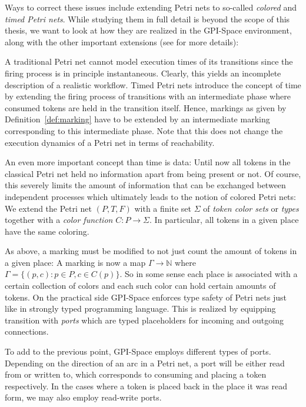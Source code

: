 \documentclass[
  paper=a4,
  titlepage,
  bibliography=totoc,
  pagesize=pdftex
]{scrartcl}
\numberwithin{figure}{section}
\numberwithin{equation}{section}
\numberwithin{table}{section}
\newcommand*\setN{\mathds{N}}
\theoremstyle{definition}
\numberwithin{definition}{section}
\begin{document}
Ways to correct these issues include extending Petri nets to so-called \emph{colored} and
\emph{timed Petri nets}. While studying them in full detail is beyond the scope of this
thesis, we want to look at how they are realized in the GPI-Space environment, along with
the other important extensions (see \cite[Section~3.2.2]{towardsParallel} for more
details):

A traditional Petri net cannot model execution times of its transitions since the firing
process is in principle instantaneous. Clearly, this yields an incomplete description of
a realistic workflow. Timed Petri nets introduce the concept of time by extending the
firing process of transitions with an intermediate phase where consumed tokens are held in
the transition itself. Hence, markings as given by Definition~\ref{def:marking} have to be
extended by an intermediate marking corresponding to this intermediate phase. Note that
this does not change the execution dynamics of a Petri net in terms of reachability.

An even more important concept than time is data: Until now all tokens in the classical
Petri net held no information apart from being present or not. Of course, this severely
limits the amount of information that can be exchanged between independent processes which
ultimately leads to the notion of colored Petri nets: We extend the Petri net $(P,T,F)$
with a finite set $\Sigma$ of \emph{token color sets} or \emph{types} together with a
\emph{color function} $C:P\to\Sigma$. In particular, all tokens in a given place have the
same coloring.

As above, a marking must be modified to not just count the amount of tokens in a given
place: A marking is now a map $\Gamma \to \setN$ where $\Gamma = \{ (p,c) : p \in P, c \in
C(p) \}$. So in some sense each place is associated with a certain collection of colors
and each such color can hold certain amounts of tokens. On the practical side GPI-Space
enforces type safety of Petri nets just like in strongly typed programming language. This
is realized by equipping transition with \emph{ports} which are typed placeholders for
incoming and outgoing connections.

To add to the previous point, GPI-Space employs different types of ports. Depending on the
direction of an arc in a Petri net, a port will be either read from or written to, which
corresponds to consuming and placing a token respectively. In the cases where a token is
placed back in the place it was read form, we may also employ read-write ports.
\end{document}
